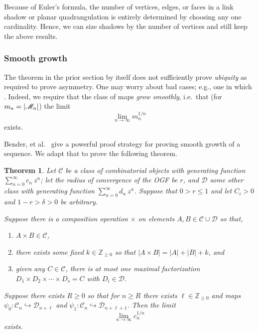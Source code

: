 \documentclass[amsmath,longbibliography,secnumarabic,floatfix,amssymb,nofootinbib,nobibnotes,letterpaper,11pt,tightenlines,notitlepage,showkeys,showlabels]{amsart}%
\newcommand{\Z}{\mathbb{Z}} \newcommand{\N}{\mathbb{N}}
\newcommand{\ArbClass}{\mathscr{C}}
\newcommand{\ArbSubClass}{\mathscr{D}}
\newcommand{\arbsubclass}{d}
\newcommand{\arbclass}{c}
\newtheorem{theorem}{Theorem}
\theoremstyle{definition}
\begin{document}
Because of Euler's formula, the number of vertices, edges, or faces in a link shadow or planar
quadrangulation is entirely determined by choosing any one cardinality. Hence, we can size shadows
by the number of vertices and still keep the above results.

\subsubsection{Smooth growth}
\label{sec:smooth-growth}

The theorem in the prior section by itself does not sufficiently prove \emph{ubiquity} as required
to prove asymmetry. One may worry about bad cases; e.g., one in which . Indeed, we require that the
class of maps \emph{grow smoothly}, i.e.\ that (for $m_n = |\mathscr{M}_n|$) the limit
\[ \lim_{n\to\infty}{m_n^{1/n}} \] exists.

Bender, et al.\ \cite{Bender1992104} give a powerful proof strategy for proving smooth growth of a
sequence. We adapt that to prove the following theorem.

\begin{theorem}
  Let $\ArbClass$ be a class of combinatorial objects with generating
  function $\sum_{n=0}^{\infty}{\arbclass_n~z^n}$; let the radius of
  convergence of the OGF be $r$, and $\ArbSubClass$ some other class
  with generating function
  $\sum_{n=0}^{\infty}{\arbsubclass_n~z^n}$. Suppose that $0 > r \le
  1$ and let $C_i > 0$ and $1-r>\delta>0$ be arbitrary.

  Suppose there is a composition operation $\times$ on elements $A, B
  \in \ArbClass \cup \ArbSubClass$ so that,
  \begin{enumerate}
  \item $A \times B \in \ArbClass$,
  \item there exists some fixed $k \in \Z_{\ge 0}$ so that $|A \times
    B| = |A| + |B| + k$, and
  \item given any $C \in \ArbClass$, there is at most one maximal
    factorization $D_1 \times D_2 \times \cdots \times D_s = C$ with $D_i
    \in \ArbSubClass$.
  \end{enumerate} Suppose there exists $R \ge 0$ so that for $n \ge R$
  there exists $\ell \in \Z_{\ge 0}$ and maps $\psi_0: \ArbClass_n
  \hookrightarrow \ArbSubClass_{n+\ell}$ and $ \psi_1: \ArbClass_n
  \hookrightarrow \ArbSubClass_{n+\ell+1}$. Then the limit
  \[ \lim_{n\to\infty}{\arbclass_n^{1/n}} \] exists.
\end{theorem}
\end{document}
